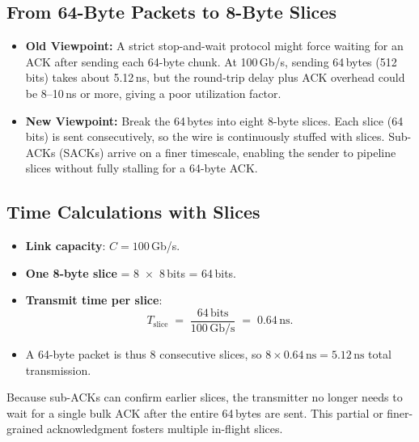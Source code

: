 \documentclass[../../../OAE-SPEC-MAIN.tex]{subfiles}
\begin{document}

\subsection{From 64-Byte Packets to 8-Byte Slices}

\begin{itemize}
\item \textbf{Old Viewpoint:} A strict stop-and-wait protocol might force waiting for an ACK after sending each 64-byte chunk.  
At 100\,Gb/s, sending 64\,bytes (512 bits) takes about 5.12\,ns, but the round-trip delay plus ACK overhead could be 8--10\,ns or more, giving a poor utilization factor.

\item \textbf{New Viewpoint:} 
Break the 64\,bytes into eight 8-byte slices. Each slice (64 bits) is sent consecutively, so the wire is continuously stuffed with slices. Sub-ACKs (SACKs) arrive on a finer timescale, enabling the sender to pipeline slices without fully stalling for a 64-byte ACK.
\end{itemize}


\subsection{Time Calculations with Slices}

\begin{itemize}
\item \textbf{Link capacity}: $C = 100$\,Gb/s.
\item \textbf{One 8-byte slice} = 8~$\times$~8\,bits = 64\,bits.
\item \textbf{Transmit time per slice}:
\[
  T_{\text{slice}} \;=\; \frac{64 \,\text{bits}}{100\,\text{Gb/s}}
  \;=\; 0.64\,\text{ns}.
\]
\item A 64-byte packet is thus 8 consecutive slices, so $8 \times 0.64\,\text{ns} = 5.12\,\text{ns}$ total transmission. 
\end{itemize}

Because sub-ACKs can confirm earlier slices, the transmitter no longer needs to wait for a single bulk ACK after the entire 64\,bytes are sent. This partial or finer-grained acknowledgment fosters multiple in-flight slices.

\end{document}
